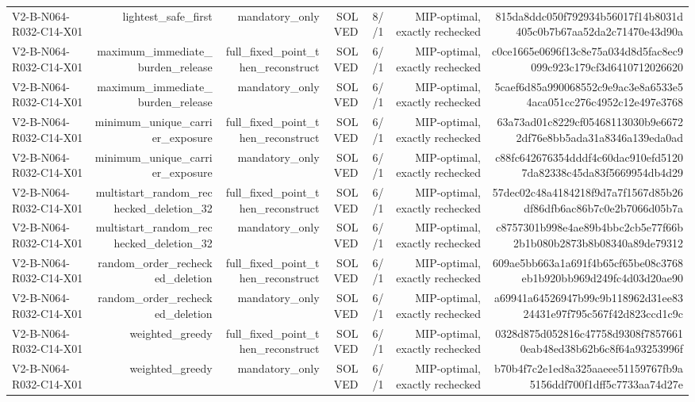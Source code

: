 {\begin{longtable}{lrrrrrr}
V2-B-N064-R032-C14-X01 & lightest\_safe\_first & mandatory\_only & SOLVED & 8//1 & MIP-optimal, exactly rechecked & 815da8ddc050f792934b56017f14b8031d405c0b7b67aa52da2c71470e43d90a \\
V2-B-N064-R032-C14-X01 & maximum\_immediate\_burden\_release & full\_fixed\_point\_then\_reconstruct & SOLVED & 6//1 & MIP-optimal, exactly rechecked & c0ce1665e0696f13c8e75a034d8d5fac8ec9099c923c179cf3d6410712026620 \\
V2-B-N064-R032-C14-X01 & maximum\_immediate\_burden\_release & mandatory\_only & SOLVED & 6//1 & MIP-optimal, exactly rechecked & 5caef6d85a990068552c9e9ac3e8a6533e54aca051cc276c4952c12e497e3768 \\
V2-B-N064-R032-C14-X01 & minimum\_unique\_carrier\_exposure & full\_fixed\_point\_then\_reconstruct & SOLVED & 6//1 & MIP-optimal, exactly rechecked & 63a73ad01c8229cf05468113030b9e66722df76e8bb5ada31a8346a139eda0ad \\
V2-B-N064-R032-C14-X01 & minimum\_unique\_carrier\_exposure & mandatory\_only & SOLVED & 6//1 & MIP-optimal, exactly rechecked & c88fc642676354dddf4c60dac910efd51207da82338c45da83f5669954db4d29 \\
V2-B-N064-R032-C14-X01 & multistart\_random\_rechecked\_deletion\_32 & full\_fixed\_point\_then\_reconstruct & SOLVED & 6//1 & MIP-optimal, exactly rechecked & 57dec02c48a4184218f9d7a7f1567d85b26df86dfb6ac86b7c0e2b7066d05b7a \\
V2-B-N064-R032-C14-X01 & multistart\_random\_rechecked\_deletion\_32 & mandatory\_only & SOLVED & 6//1 & MIP-optimal, exactly rechecked & c8757301b998e4ae89b4bbc2cb5e77f66b2b1b080b2873b8b08340a89de79312 \\
V2-B-N064-R032-C14-X01 & random\_order\_rechecked\_deletion & full\_fixed\_point\_then\_reconstruct & SOLVED & 6//1 & MIP-optimal, exactly rechecked & 609ae5bb663a1a691f4b65cf65be08c3768eb1b920bb969d249fc4d03d20ae90 \\
V2-B-N064-R032-C14-X01 & random\_order\_rechecked\_deletion & mandatory\_only & SOLVED & 6//1 & MIP-optimal, exactly rechecked & a69941a64526947b99c9b118962d31ee8324431e97f795c567f42d823ccd1c9c \\
V2-B-N064-R032-C14-X01 & weighted\_greedy & full\_fixed\_point\_then\_reconstruct & SOLVED & 6//1 & MIP-optimal, exactly rechecked & 0328d875d052816c47758d9308f78576610eab48ed38b62b6c8f64a93253996f \\
V2-B-N064-R032-C14-X01 & weighted\_greedy & mandatory\_only & SOLVED & 6//1 & MIP-optimal, exactly rechecked & b70b4f7c2e1ed8a325aaeee51159767fb9a5156ddf700f1dff5c7733aa74d27e \\

\end{longtable}}
